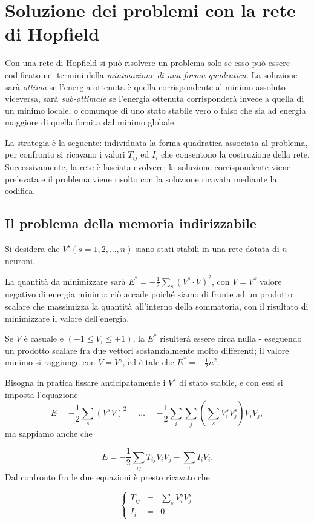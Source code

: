 \documentclass[10pt]{book}
\begin{document}
\section{Soluzione dei problemi con la rete di Hopfield}

Con una rete di Hopfield si può risolvere un problema solo se esso può essere
codificato nei termini della \emph{minimazione di una forma quadratica}. La
soluzione sarà \emph{ottima} se l'energia ottenuta è quella corrispondente al
minimo assoluto \---- viceversa, sarà \emph{sub-ottimale} se l'energia ottenuta
corrisponderà invece a quella di un minimo locale, o comunque di uno stato
stabile vero o falso che sia ad energia maggiore di quella fornita dal minimo
globale.

La strategia è la seguente: individuata la forma quadratica associata al
problema, per confronto si ricavano i valori $T_{ij}$ ed $I_i$ che consentono
la costruzione della rete. Successivamente, la rete è lasciata evolvere; la
soluzione corrispondente viene prelevata e il problema viene risolto con la
soluzione ricavata mediante la codifica.

\subsection{Il problema della memoria indirizzabile}

Si desidera che $V^s(s=1,2,\dots, n)$ siano stati stabili in una rete dotata di
$n$ neuroni. 

La quantità da minimizzare sarà $E^* = -\frac 1 2 \sum_s (V^s\cdot
V)^2$, con $V=V^s$ valore negativo di energia minimo: ciò accade poiché siamo
di fronte ad un prodotto scalare che massimizza la quantità all'interno della
sommatoria, con il risultato di minimizzare il valore dell'energia. 

Se $V$ è
casuale e $(-1 \leq V_i \leq +1)$, la $E^*$ risulterà essere circa nulla \--
eseguendo un prodotto scalare fra due vettori sostanzialmente molto differenti;
il valore minimo si raggiunge con $V=V^s$, ed è tale che $E^* = -\frac 1 2
n^2$. 

Bisogna in pratica fissare anticipatamente i $V^s$ di stato stabile, e
con essi si imposta l'equazione $$ E = -\frac 1 2 \sum_s (V^s V)^2 = \dots =
-\frac 1 2 \sum_i \sum_j (\sum_s V_i^s V_j^s)V_i V_j,$$ ma sappiamo anche che

$$E= -\frac 1 2 \sum_{ij} T_{ij}V_i V_j - \sum_i I_i V_i.$$ Dal confronto fra
le due equazioni è presto ricavato che 

$$
\left\{
    \begin{array}{lll}
        T_{ij} & = & \sum_s V_i^s V_j^s \\
        I_i & = & 0
    \end{array}
\right.
$$
\end{document}
